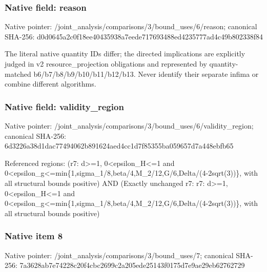 \documentclass[10pt,a4paper]{article}
\begin{document}
\subsubsection{Native field: reason}
Native pointer: /joint\_\allowbreak{}analysis/comparisons/3/bound\_\allowbreak{}uses/6/reason; canonical SHA-256: d0d0645a2c0f18ee40435938a7eede717693488ed4235777ad4c49b802338f84

\begingroup\raggedright\sloppy The literal native quantity IDs differ;\allowbreak{} the directed implications are explicitly judged in v2 resource\_\allowbreak{}projection obligations and represented by quantity-matched b6/\allowbreak{}b7/\allowbreak{}b8/\allowbreak{}b9/\allowbreak{}b10/\allowbreak{}b11/\allowbreak{}b12/\allowbreak{}b13. Never identify their separate infima or combine different algorithms.\par\endgroup

\subsubsection{Native field: validity\_\allowbreak{}region}
Native pointer: /joint\_\allowbreak{}analysis/comparisons/3/bound\_\allowbreak{}uses/6/validity\_\allowbreak{}region; canonical SHA-256: 6d3226a38d1dac77494062b891624aed4cc1d7f85355ba059657d7a448ebfb65

\begingroup\raggedright\sloppy Referenced regions:\allowbreak{} (r7:\allowbreak{} d>=\allowbreak{}1,\allowbreak{} 0<epsilon\_\allowbreak{}H<=\allowbreak{}1 and 0<epsilon\_\allowbreak{}g<=\allowbreak{}min\{1,\allowbreak{}sigma\_\allowbreak{}1/\allowbreak{}8,\allowbreak{}beta/\allowbreak{}4,\allowbreak{}M\_\allowbreak{}2/\allowbreak{}12,\allowbreak{}G/\allowbreak{}6,\allowbreak{}Delta/\allowbreak{}(4-2sqrt(3))\},\allowbreak{} with all structural bounds positive) AND (Exactly unchanged r7:\allowbreak{} r7:\allowbreak{} d>=\allowbreak{}1,\allowbreak{} 0<epsilon\_\allowbreak{}H<=\allowbreak{}1 and 0<epsilon\_\allowbreak{}g<=\allowbreak{}min\{1,\allowbreak{}sigma\_\allowbreak{}1/\allowbreak{}8,\allowbreak{}beta/\allowbreak{}4,\allowbreak{}M\_\allowbreak{}2/\allowbreak{}12,\allowbreak{}G/\allowbreak{}6,\allowbreak{}Delta/\allowbreak{}(4-2sqrt(3))\},\allowbreak{} with all structural bounds positive)\par\endgroup

\subsubsection{Native item 8}
Native pointer: /joint\_\allowbreak{}analysis/comparisons/3/bound\_\allowbreak{}uses/7; canonical SHA-256: 7a3628ab7e74228c20f4cbc2699c2a205ede25143f0175d7e9ae29eb62762729
\end{document}
